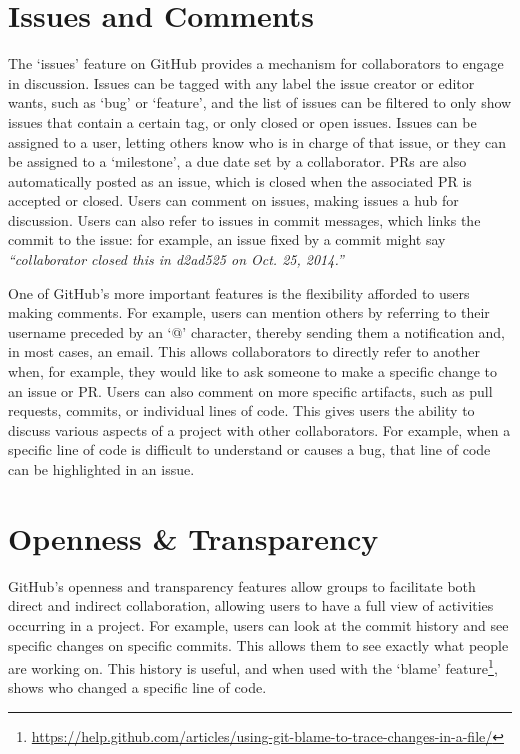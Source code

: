 \section{Issues and Comments}
The `issues' feature on GitHub provides a mechanism for collaborators to engage in discussion. Issues can be tagged with any label the issue creator or editor wants, such as `bug' or `feature', and the list of issues can be filtered to only show issues that contain a certain tag, or only closed or open issues. Issues can be assigned to a user, letting others know who is in charge of that issue, or they can be assigned to a `milestone', a due date set by a collaborator. PRs are also automatically posted as an issue, which is closed when the associated PR is accepted or closed. Users can comment on issues, making issues a hub for discussion. Users can also refer to issues in commit messages, which links the commit to the issue: for example, an issue fixed by a commit might say \textit{``collaborator closed this in d2ad525 on Oct. 25, 2014.''}

One of GitHub's more important features is the flexibility afforded to users making comments. For example, users can mention others by referring to their username preceded by an `@' character, thereby sending them a notification and, in most cases, an email. This allows collaborators to directly refer to another when, for example, they would like to ask someone to make a specific change to an issue or PR. Users can also comment on more specific artifacts, such as pull requests, commits, or individual lines of code. This gives users the ability to discuss various aspects of a project with other collaborators. For example, when a specific line of code is difficult to understand or causes a bug, that line of code can be highlighted in an issue.

\section{Openness \& Transparency}
GitHub's openness and transparency features allow groups to facilitate both direct and indirect collaboration, allowing users to have a full view of activities occurring in a project. For example, users can look at the commit history and see specific changes on specific commits. This allows them to see exactly what people are working on. This history is useful, and when used with the `blame' feature\footnote{\url{https://help.github.com/articles/using-git-blame-to-trace-changes-in-a-file/}}, shows who changed a specific line of code.

